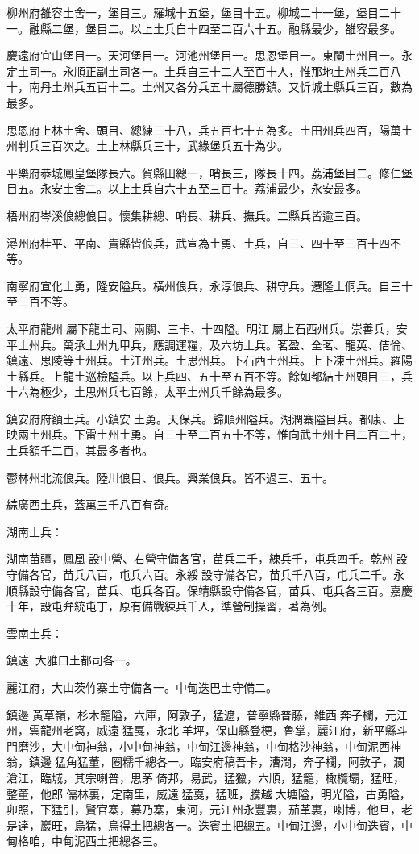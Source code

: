 \begin{pinyinscope}
柳州府雒容土舍一，堡目三。羅城十五堡，堡目十五。柳城二十一堡，堡目二十一。融縣二堡，堡目二。以上土兵自十四至二百六十五。融縣最少，雒容最多。

慶遠府宜山堡目一。天河堡目一。河池州堡目一。思恩堡目一。東闌土州目一。永定土司一。永順正副土司各一。土兵自三十二人至百十人，惟那地土州兵二百八十，南丹土州兵五百十二。土州又各分兵五十屬德勝鎮。又忻城土縣兵三百，數為最多。

思恩府上林土舍、頭目、總練三十八，兵五百七十五為多。土田州兵四百，陽萬土州判兵三百次之。土上林縣兵三十，武緣堡兵五十為少。

平樂府恭城鳳皇堡隊長六。賀縣田總一，哨長三，隊長十四。荔浦堡目二。修仁堡目五。永安土舍二。以上土兵自六十五至三百十。荔浦最少，永安最多。

梧州府岑溪俍總俍目。懷集耕總、哨長、耕兵、撫兵。二縣兵皆逾三百。

潯州府桂平、平南、貴縣皆俍兵，武宣為土勇、土兵，自三、四十至三百十四不等。

南寧府宣化土勇，隆安隘兵。橫州俍兵，永淳俍兵、耕守兵。遷隆土侗兵。自三十至三百不等。

太平府龍州屬下龍土司、兩關、三卡、十四隘。明江屬上石西州兵。崇善兵，安平土州兵。萬承土州九甲兵，應調運糧，及六坊土兵。茗盈、全茗、龍英、佶倫、鎮遠、思陵等土州兵。土江州兵。土思州兵。下石西土州兵。上下凍土州兵。羅陽土縣兵。上龍土巡檢隘兵。以上兵四、五十至五百不等。餘如都結土州頭目三，兵十六為極少，土思州兵七百餘，太平土州兵千餘為最多。

鎮安府府額土兵。小鎮安土勇。天保兵。歸順州隘兵。湖潤寨隘目兵。都康、上映兩土州兵。下雷土州土勇。自三十至二百五十不等，惟向武土州土目二百二十，土兵額千二百，其最多者也。

鬱林州北流俍兵。陸川俍目、俍兵。興業俍兵。皆不過三、五十。

綜廣西土兵，蓋萬三千八百有奇。

湖南土兵：

湖南苗疆，鳳凰設中營、右營守備各官，苗兵二千，練兵千，屯兵四千。乾州設守備各官，苗兵八百，屯兵六百。永綏設守備各官，苗兵千八百，屯兵二千。永順縣設守備各官，苗兵、屯兵各百。保靖縣設守備各官，苗兵、屯兵各三百。嘉慶十年，設屯弁統屯丁，原有備戰練兵千人，準營制操習，著為例。

雲南土兵：

鎮遠，大雅口土都司各一。

麗江府，大山茨竹寨土守備各一。中甸迭巴土守備二。

鎮邊黃草嶺，杉木籠隘，六庫，阿敦子，猛遮，普寧縣普藤，維西奔子欄，元江州，雲龍州老窩，威遠猛戛，永北羊坪，保山縣登梗，魯掌，麗江府，新平縣斗門磨沙，大中甸神翁，小中甸神翁，中甸江邊神翁，中甸格沙神翁，中甸泥西神翁，鎮邊猛角猛董，圈糯千總各一。臨安府稿吾卡，漕澗，奔子欄，阿敦子，瀾滄江，臨城，其宗喇普，思茅倚邦，易武，猛獵，六順，猛籠，橄欖壩，猛旺，整董，他郎儒林裏，定南里，威遠猛戛，猛班，騰越大塘隘，明光隘，古勇隘，卯照，下猛引，賢官寨，募乃寨，東河，元江州永豐裏，茄革裏，喇博，他旦，老是達，巖旺，烏猛，烏得土把總各一。迭賓土把總五。中甸江邊，小中甸迭賓，中甸格咱，中甸泥西土把總各三。


\end{pinyinscope}
